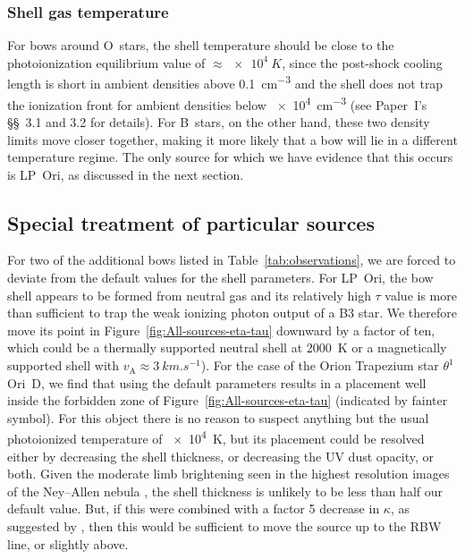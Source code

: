 \documentclass[useAMS, usenatbib, a4paper]{mnras}
\newcommand{\alfven}{\ensuremath{_{\scriptscriptstyle\text{A}}}}
\newcommand{\thD}{\(\theta^1\)\,Ori~D}
\begin{document}
\subsubsection{Shell gas temperature}
\label{sec:shell-gas-temp}
For bows around O~stars, the shell temperature should be close to the
photoionization equilibrium value of \(\approx \SI{e4}{K}\), since the
post-shock cooling length is short in ambient densities above
\SI{0.1}{cm^{-3}}
and the shell does not trap the ionization front for ambient densities
below \SI{e4}{cm^{-3}} (see Paper~I's \S\S~3.1 and 3.2 for details).
For B~stars, on the other hand, these two density limits move closer
together,
making it more likely that a bow will lie in a different temperature
regime.  The only source for which we have evidence that this occurs
is LP~Ori, as discussed in the next section.

\subsection{Special treatment of particular sources}
\label{sec:spec-treatm-part}

For two of the additional bows listed in Table~\ref{tab:observations},
we are forced to deviate from the default values for the shell
parameters.  For LP~Ori, the bow shell appears to be formed from
neutral gas \citep{ODell:2001c} and its relatively high \(\tau\) value is
more than sufficient to trap the weak ionizing photon output of a B3
star.  We therefore move its point in
Figure~\ref{fig:All-sources-eta-tau} downward by a factor of ten,
which could be a thermally supported neutral shell at \SI{2000}{K} or
a magnetically supported shell with
\(v\alfven \approx \SI{3}{km.s^{-1}}\)).  For the case of the Orion
Trapezium star \thD{}, we find that using the default parameters
results in a placement well inside the forbidden zone of
Figure~\ref{fig:All-sources-eta-tau} (indicated by fainter symbol).
For this object there is no reason to suspect anything but the usual
photoionized temperature of \SI{e4}{K}, but its placement could be
resolved either by decreasing the shell thickness, or decreasing the
UV dust opacity, or both. Given the moderate limb brightening seen in
the highest resolution images of the Ney--Allen nebula
\citep{Robberto:2005a, Smith:2005a}, the shell thickness is unlikely
to be less than half our default value.  But, if this were combined
with a factor 5 decrease in \(\kappa\), as suggested by
\citet{Salgado:2016a}, then this would be sufficient to move the
source up to the RBW line, or slightly above.
\end{document}
